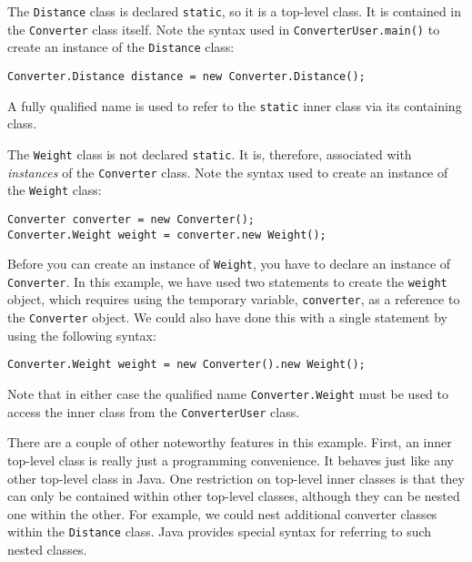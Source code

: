 The {\tt Distance} class is declared {\tt static}, so it is a
top-level class.  It is contained in the {\tt Converter} class
itself.  Note the syntax used in {\tt ConverterUser.main()} to create
an instance of the {\tt Distance} class:

\begin{jjjlisting}
\begin{lstlisting}
Converter.Distance distance = new Converter.Distance();
\end{lstlisting}
\end{jjjlisting}

\noindent A fully qualified name is used to refer to the {\tt static}
inner class via its containing class.


The {\tt Weight} class is not declared {\tt static}.  It is, therefore,
associated with {\it instances} of the {\tt Converter} class.  Note
the syntax used to create an instance of the {\tt Weight} class:

\begin{jjjlisting}
\begin{lstlisting}
Converter converter = new Converter();
Converter.Weight weight = converter.new Weight();
\end{lstlisting}
\end{jjjlisting}

\noindent Before you can create an instance of {\tt Weight}, you
have to declare an instance of {\tt Converter}. In this example, we
have used two statements to create the {\tt weight} object,
which requires using the temporary variable, {\tt converter},
as a reference to the {\tt Converter} object.  We could also
have done this with a single statement by using the following
syntax:

\begin{jjjlisting}
\begin{lstlisting}
Converter.Weight weight = new Converter().new Weight();
\end{lstlisting}
\end{jjjlisting}

\noindent Note that in either case
the qualified name {\tt Converter.Weight} must be used to access the
inner class from the {\tt ConverterUser} class.

There are a couple of other noteworthy features in this example.
First, an inner top-level class is really just a programming
convenience.   It behaves just like any other top-level class in Java.
One restriction on top-level inner classes is that they can only be
contained within other top-level classes, although they can be nested
one within the other.  For example, we could nest additional converter
classes within the {\tt Distance} class.   Java provides special syntax
for referring to such nested classes.

